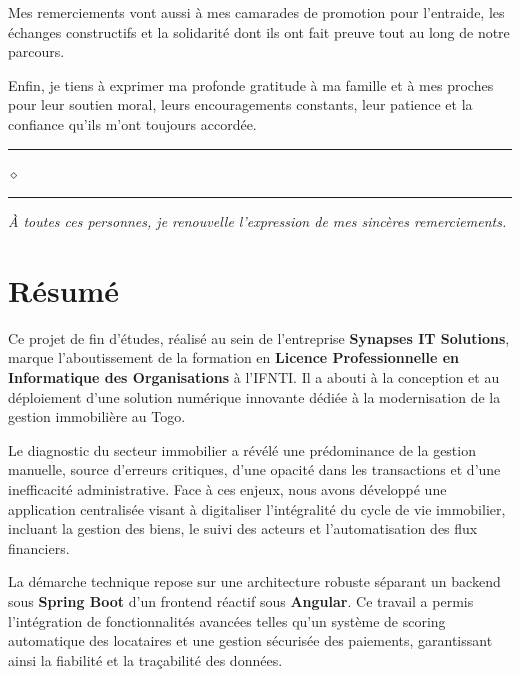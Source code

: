\documentclass[12pt,a4paper]{report}
\newcommand{\motcle}[1]{\textcolor{marine}{\textbf{#1}}}
\newcommand{\important}[1]{\textcolor{cuivre}{\textbf{#1}}}
\newcommand{\separateur}{%
    \vspace{0.5cm}%
    \begin{center}%
        \textcolor{grismoyen}{\rule{2cm}{0.4pt}}%
        \hspace{0.5em}%
        \textcolor{cuivre}{$\diamond$}%
        \hspace{0.5em}%
        \textcolor{grismoyen}{\rule{2cm}{0.4pt}}%
    \end{center}%
    \vspace{0.3cm}%
}
\begin{document}
\vspace{0.3cm}

Mes remerciements vont aussi à mes camarades de promotion pour l'entraide, les échanges constructifs et la solidarité dont ils ont fait preuve tout au long de notre parcours.

\vspace{0.3cm}

Enfin, je tiens à exprimer ma profonde gratitude à ma famille et à mes proches pour leur soutien moral, leurs encouragements constants, leur patience et la confiance qu'ils m'ont toujours accordée.



\separateur

\begin{center}
    \textit{\textcolor{bleugris}{À toutes ces personnes, je renouvelle l'expression de mes sincères remerciements.}}
\end{center}
\newpage

\chapter*{Résumé}

\begin{highlightbox}
Ce projet de fin d'études, réalisé au sein de l'entreprise \important{Synapses IT Solutions}, marque l'aboutissement de la formation en \motcle{Licence Professionnelle en Informatique des Organisations} à l'IFNTI. Il a abouti à la conception et au déploiement d'une solution numérique innovante dédiée à la modernisation de la gestion immobilière au Togo.
\end{highlightbox}

\vspace{0.4cm}

Le diagnostic du secteur immobilier a révélé une prédominance de la gestion manuelle, source d'erreurs critiques, d'une opacité dans les transactions et d'une inefficacité administrative. Face à ces enjeux, nous avons développé une application centralisée visant à digitaliser l'intégralité du cycle de vie immobilier, incluant la gestion des biens, le suivi des acteurs et l'automatisation des flux financiers.

\vspace{0.4cm}

La démarche technique repose sur une architecture robuste séparant un backend sous \textbf{Spring Boot} d'un frontend réactif sous \textbf{Angular}. Ce travail a permis l'intégration de fonctionnalités avancées telles qu'un système de scoring automatique des locataires et une gestion sécurisée des paiements, garantissant ainsi la fiabilité et la traçabilité des données.
\end{document}
